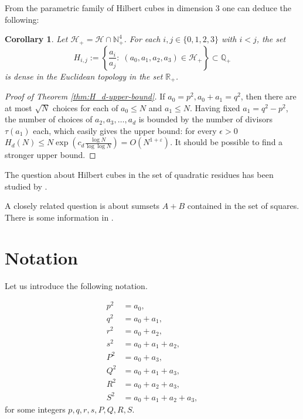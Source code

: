 \documentclass[10pt]{amsart}
\theoremstyle{plain}
\newtheorem{cor}[thm]{Corollary}
\def\cal{\mathcal}
\def\bbb{\mathbb}
\newcommand{\R}{\bbb{R}}
\newcommand{\N}{\bbb{N}}
\newcommand{\Q}{\bbb{Q}}
\begin{document}
From the parametric family of Hilbert cubes 
in dimension $3$ one can deduce the following:
\begin{cor}{\label{cor-fractions}}
Let $\cal{H}_{+}=\cal{H}\cap \N_{+}^{4}$. For each $i, j\in\{0, 1, 2, 3\}$ with $i<j$, the set
$$
H_{i,j}:=\left\{\frac{a_{i}}{a_{j}}:\;(a_{0}, a_{1}, a_{2}, a_{3})\in\cal{H}_{+}\right\}\subset \Q_{+}
$$
is dense in the Euclidean topology in the set $\R_{+}$.
\end{cor}



\begin{proof}[Proof of Theorem \ref{thm:H_d-upper-bound}]
If $a_{0}=p^2, a_{0}+a_{1}=q^2$, then there are at most $\sqrt{N}$ choices for each of $a_0\leq N$ and $a_1\leq N$.
Having fixed $a_1=q^2-p^2$, the number of choices of $a_2, a_3, \ldots , a_d$ is bounded by the number of divisors $\tau(a_1)$ each, which easily gives the upper bound: for every $\epsilon>0$ 
$H_d(N)\leq N\exp(c_d \frac{\log N}{\log \log N})=O(N^{1+\varepsilon})$.
It should be possible to find a stronger upper bound.
\end{proof}

The question about Hilbert cubes in the set of quadratic residues has been studied by
\cite{Alsetri-Shao, Dietmann-Elsholtz:2012,
Dietmann-Elsholtz-Shparlinski,
HegyvariandSarkozy:1999, Schoen}.


A closely related question is about sumsets $A+B$ contained in the set of squares. There is some information 
in \cite{AlonandAngelandBenjaminiandLubetzky:2012, DujellaandElsholtz:2013}.





\section{Notation}
Let us introduce the following notation.

\begin{equation}\label{Hsystem}
\begin{aligned}
p^2&=a_{0},\\
q^2&=a_{0}+a_{1},\\
r^2&=a_{0}+a_{2},\\
s^2&=a_{0}+a_{1}+a_{2},\\
P^2&=a_{0}+a_{3},\\
Q^2&=a_{0}+a_{1}+a_{3},\\
R^2&=a_{0}+a_{2}+a_{3},\\
S^2&=a_{0}+a_{1}+a_{2}+a_{3},
\end{aligned}
\end{equation}
for some integers $p, q,r,s, P,Q,R, S$.
\end{document}
